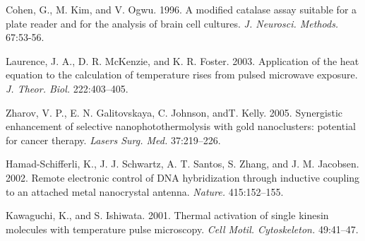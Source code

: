 \documentclass{biophys}
\newcommand{\BibTeX}{\textsc{Bib}\TeX}       %
\begin{document}
\begin{thebibliography}{99}
Cohen, G., M. Kim, and V. Ogwu. 1996. A modified catalase assay suitable for a plate reader and for the analysis of brain cell cultures. {\it J. Neurosci. Methods.} 67:53-56.


Laurence, J. A., D. R. McKenzie, and K. R. Foster. 2003. Application of the heat equation to the calculation of temperature rises from pulsed microwave exposure. {\it J. Theor. Biol.} 222:403--405.



Zharov, V. P., E. N. Galitovskaya, C. Johnson, and\break T. Kelly. 2005. \pagebreak Synergistic enhancement of selective nanophotothermolysis with gold nanoclusters: potential for cancer therapy. {\it Lasers Surg. Med.} 37:219--226.

Hamad-Schifferli, K., J. J. Schwartz, A. T. Santos, S. Zhang, and J. M. Jacobsen. 2002. Remote electronic control of DNA hybridization through inductive coupling to an attached metal nanocrystal antenna. {\it Nature.} 415:152--155.


Kawaguchi, K., and S. Ishiwata. 2001. Thermal activation of single kinesin molecules with temperature pulse microscopy. {\it Cell Motil. Cytoskeleton.} 49:41--47.

\end{thebibliography}






% 

% 
\end{document}
